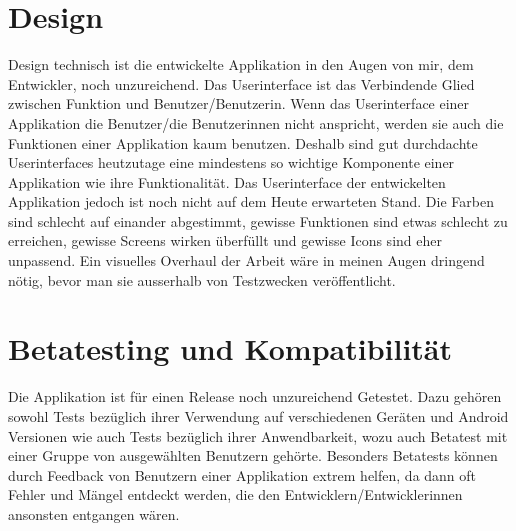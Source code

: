 \documentclass[a4paper,11pt]{report}
\begin{document}
		\section{Design}
		Design technisch ist die entwickelte Applikation in den Augen von mir, dem Entwickler, noch unzureichend. Das Userinterface ist das Verbindende Glied zwischen Funktion und Benutzer/Benutzerin. Wenn das Userinterface einer Applikation die Benutzer/die Benutzerinnen nicht anspricht, werden sie auch die Funktionen einer Applikation kaum benutzen. Deshalb sind gut durchdachte Userinterfaces heutzutage eine mindestens so wichtige Komponente einer Applikation wie ihre Funktionalität. Das Userinterface der entwickelten Applikation jedoch ist noch nicht auf dem Heute erwarteten Stand. Die Farben sind schlecht auf einander abgestimmt, gewisse Funktionen sind etwas schlecht zu erreichen, gewisse Screens wirken überfüllt und gewisse Icons sind eher unpassend. Ein visuelles Overhaul der Arbeit wäre in meinen Augen dringend nötig, bevor man sie ausserhalb von Testzwecken veröffentlicht.
		
		\section{Betatesting und Kompatibilität}
		Die Applikation ist für einen Release noch unzureichend Getestet. Dazu gehören sowohl Tests bezüglich ihrer Verwendung auf verschiedenen Geräten und Android Versionen wie auch Tests bezüglich ihrer Anwendbarkeit, wozu auch Betatest mit einer Gruppe von ausgewählten Benutzern gehörte. Besonders Betatests können durch Feedback von Benutzern einer Applikation extrem helfen, da dann oft Fehler und Mängel entdeckt werden, die den Entwicklern/Entwicklerinnen ansonsten entgangen wären.
		
\newpage
	
	
\end{document}
